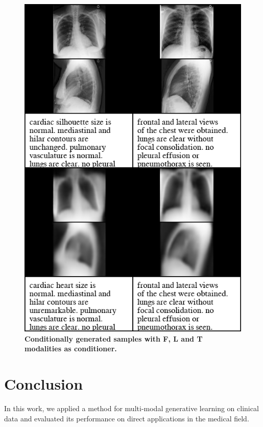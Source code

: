 \documentclass{midl} %
\begin{document}
\begin{figure}[h]
\begin{minipage}[t]{.45\textwidth}
\begin{center}
      \includegraphics[scale=0.25]{data/cond_gen/Lateral_PA_text_small}
      \caption{\small{\textbf{Conditionally generated samples with F, L and T modalities as conditioner.}}}
      \label{fig:fig_cond_latPAtext}
    \end{center}
  \end{minipage}
  \hfill
    \end{figure}
    
\section{Conclusion}
    In this work, we applied a method for multi-modal generative learning on clinical data and evaluated its performance on direct applications in the medical field.
    
\end{document}
